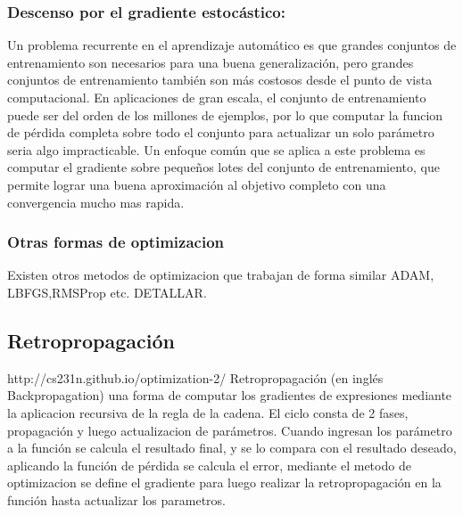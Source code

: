 \documentclass[a4paper,11pt,spanish]{book}
\begin{document}
      \subsubsection{Descenso por el gradiente estocástico:}
	Un problema recurrente en el aprendizaje automático es que grandes conjuntos de entrenamiento son necesarios para una buena generalización, 
	pero grandes conjuntos de entrenamiento también son más costosos desde el punto de vista computacional.
	En aplicaciones de gran escala, el conjunto de entrenamiento puede ser del orden de los millones de ejemplos, por lo que computar la funcion de 
	pérdida completa sobre todo el conjunto para actualizar un solo parámetro seria algo impracticable.
	Un enfoque común que se aplica a este problema es computar el gradiente sobre pequeños lotes del conjunto de entrenamiento, 
	que permite lograr una buena aproximación al objetivo completo con una convergencia mucho mas rapida.


      \subsubsection{Otras formas de optimizacion}
	Existen otros metodos de optimizacion que trabajan de forma similar ADAM, LBFGS,RMSProp etc. DETALLAR.
	
    \subsection{Retropropagación}
      http://cs231n.github.io/optimization-2/
      Retropropagación (en inglés Backpropagation) una forma  de computar los gradientes de expresiones mediante la aplicacion recursiva de la regla de la cadena.
      El ciclo consta de 2 fases, propagación y luego actualizacion de parámetros. Cuando ingresan los parámetro a la función se calcula el resultado final, y se lo compara con el resultado 
      deseado, aplicando la función de pérdida se calcula el error, mediante el metodo de optimizacion se define el gradiente para luego realizar la retropropagación en la función hasta 
      actualizar los parametros.
\end{document}

